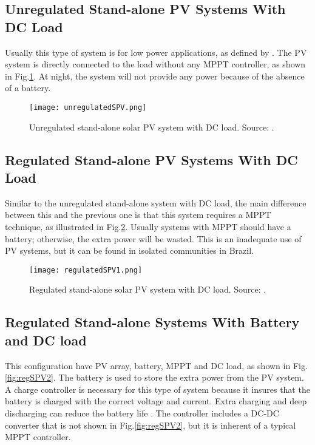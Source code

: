 \subsection{Unregulated Stand-alone PV Systems With DC Load }

Usually this type of system is for low power applications, as defined by \cite{Roy}. The PV system is directly connected to the load without any MPPT controller, as shown in Fig.\ref{fig:unregSPV}. At night, the system will not provide any power because of the absence of a battery. 
 
\begin{figure}[h]
\texttt{[image: unregulatedSPV.png]}
\centering
\caption{Unregulated stand-alone solar PV system with DC load. Source: \cite{Roy}.}
\label{fig:unregSPV}
\end{figure}

\subsection{Regulated Stand-alone PV Systems With DC Load}
Similar to the unregulated stand-alone system with DC load, the main difference between this and the previous one is that this system requires a MPPT technique, as illustrated in Fig.\ref{fig:regSPV1}. Usually systems with MPPT should have a battery; otherwise, the extra power will be wasted. This is an inadequate use of PV systems, but it can be found in isolated communities in Brazil.

\begin{figure}[h]
\texttt{[image: regulatedSPV1.png]}
\centering
\caption{Regulated stand-alone solar PV system with DC load. Source: \cite{Roy}.}
\label{fig:regSPV1}
\end{figure}

\subsection{Regulated Stand-alone Systems With Battery and DC load}

This configuration have PV array, battery, MPPT and DC load, as shown in Fig.\ref{fig:regSPV2}. The battery is used to store the extra power from the PV system. A charge controller is necessary for this type of system because it insures that the battery is charged with the correct voltage and current. Extra charging and deep discharging can reduce the battery life \cite{Kim}. The controller includes a DC-DC converter that is not shown in Fig.\ref{fig:regSPV2}, but it is inherent of a typical MPPT controller.

